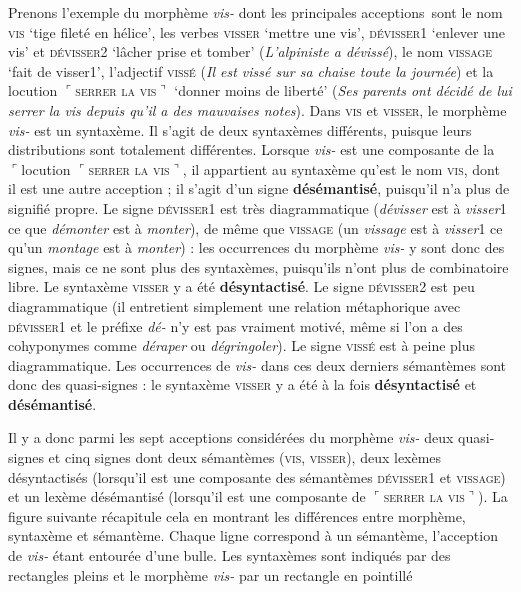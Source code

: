 Prenons l’exemple du morphème \textit{vis-} dont les principales acceptions~sont le nom \textsc{vis} ‘tige fileté en hélice’, les verbes \textsc{visser} ‘mettre une vis’, \textsc{dévisser1} ‘enlever une vis’ et \textsc{dévisser2} ‘lâcher prise et tomber’ (\textit{L’alpiniste a dévissé}), le nom \textsc{vissage} ‘fait de visser1’, l’adjectif \textsc{vissé} (\textit{Il est vissé sur sa chaise toute la journée}) et la locution $⌜$\textsc{serrer} \textsc{la} \textsc{vis}$⌝$ ‘donner moins de liberté’ (\textit{Ses parents ont décidé de lui serrer la vis depuis qu’il a des mauvaises notes}). Dans \textsc{vis} et \textsc{visser}, le morphème \textit{vis-} est un syntaxème. Il s’agit de deux syntaxèmes différents, puisque leurs distributions sont totalement différentes. Lorsque \textit{vis-} est une composante de la $⌜$locution $⌜$\textsc{serrer} \textsc{la} \textsc{vis}$⌝$, il appartient au syntaxème qu’est le nom \textsc{vis}, dont il est une autre acception ; il s’agit d’un signe \textbf{désémantisé}, puisqu’il n’a plus de signifié propre. Le signe \textsc{dévisser1} est très diagrammatique (\textit{dévisser} est à \textit{visser}1 ce que \textit{démonter} est à \textit{monter}), de même que \textsc{vissage} (un \textit{vissage} est à \textit{visser}1 ce qu’un \textit{montage} est à \textit{monter}) : les occurrences du morphème \textit{vis-} y sont donc des signes, mais ce ne sont plus des syntaxèmes, puisqu’ils n’ont plus de combinatoire libre. Le syntaxème \textsc{visser} y a été \textbf{désyntactisé}. Le signe \textsc{dévisser2} est peu diagrammatique (il entretient simplement une relation métaphorique avec \textsc{dévisser}1 et le préfixe \textit{dé-} n’y est pas vraiment motivé, même si l’on a des cohyponymes comme \textit{déraper} ou \textit{dégringoler}). Le signe \textsc{vissé} est à peine plus diagrammatique. Les occurrences de \textit{vis-} dans ces deux derniers sémantèmes sont donc des quasi-signes : le syntaxème \textsc{visser} y a été à la fois \textbf{désyntactisé} et \textbf{désémantisé}.

Il y a donc parmi les sept acceptions considérées du morphème \textit{vis-} deux quasi-signes et cinq signes dont deux sémantèmes (\textsc{vis,} \textsc{visser}), deux lexèmes désyntactisés (lorsqu’il est une composante des sémantèmes \textsc{dévisser1} et \textsc{vissage}) et un lexème désémantisé (lorsqu’il est une composante de $⌜$\textsc{serrer} \textsc{la} \textsc{vis}$⌝$). La figure suivante récapitule cela en montrant les différences entre morphème, syntaxème et sémantème. Chaque ligne correspond à un sémantème, l’acception de \textit{vis-} étant entourée d’une bulle. Les syntaxèmes sont indiqués par des rectangles pleins et le morphème \textit{vis-} par un rectangle en pointillé

